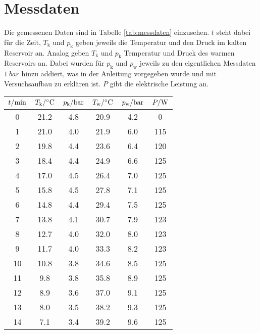 \section{Messdaten}
Die gemessenen Daten sind in Tabelle \ref{tab:messdaten} einzusehen. 
$t$ steht dabei für die Zeit, $T_\text{k}$ und $p_\text{k}$ geben jeweils die Temperatur und den Druck im kalten Reservoir an.
Analog geben $T_\text{k}$ und $p_\text{k}$ Temperatur und Druck des warmen Reservoirs an.
Dabei wurden für $p_\text{k}$ und $p_\text{w}$ jeweils zu den eigentlichen Messdaten $\qty[]{1}{bar}$ hinzu addiert,
was in der Anleitung \cite[]{man:v206} vorgegeben wurde und mit Versuchsaufbau zu erklären ist. 
$P$ gibt die elektrische Leistung an.

\begin{table}
    \centering
    \begin{tabular}[]{S[table-format=2.0] S S[table-format=1.1] S S S[table-format=3.0]}
        \toprule
        {$t / \unit[]{\minute}$} & {$T_\text{k} / \unit[]{\degreeCelsius}$} & {$p_\text{k} / \unit[]{\bar}$} & {$T_\text{w} / \unit[]{\degreeCelsius}$} & {$p_\text{w} / \unit[]{\bar}$} & {$P / \unit[]{\watt}$} \\
         & 21.2  &  4.8 & 20.9  &   4.2  &  0   \\  
        1 & 21.0  &  4.0 & 21.9  &   6.0  &  115 \\
        2 & 19.8  &  4.4 & 23.6  &   6.4  &  120 \\
        3 & 18.4  &  4.4 & 24.9  &   6.6  &  125 \\
        4 & 17.0  &  4.5 & 26.4  &   7.0  &  125 \\
        5 & 15.8  &  4.5 & 27.8  &   7.1  &  125 \\
        6 & 14.8  &  4.4 & 29.4  &   7.5  &  125 \\
        7 & 13.8  &  4.1 & 30.7  &   7.9  &  123 \\
        8 & 12.7  &  4.0 & 32.0  &   8.0  &  123 \\
        9 & 11.7  &  4.0 & 33.3  &   8.2  &  123 \\
       10 & 10.8  &  3.8 & 34.6  &   8.5  &  125 \\
       11 &  9.8  &  3.8 & 35.8  &   8.9  &  125 \\
       12 &  8.9  &  3.6 & 37.0  &   9.1  &  125 \\
       13 &  8.0  &  3.5 & 38.2  &   9.3  &  125 \\
       14 &  7.1  &  3.4 & 39.2  &   9.6  &  125 \\

\end{tabular}
\end{table}
